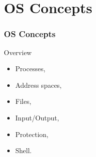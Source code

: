\section{OS Concepts}
  \begin{frame}
    \frametitle{OS Concepts}
        \begin{block}{Overview}
          \begin{itemize}
            \item Processes,
            \item Address spaces,
            \item Files,
            \item Input/Output,
            \item Protection,
            \item Shell.
          \end{itemize}
        \end{block}
  \end{frame}

